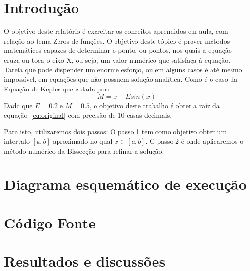 \documentclass[12pt]{article}
\begin{document}
\section{Introdução}

O objetivo deste relatório é exercitar os conceitos aprendidos em aula, com relação ao tema Zeros de funções. O objetivo deste tópico é prover métodos matemáticos capazes de determinar o ponto, ou pontos, nos quais a equação cruza ou toca o eixo X, ou seja, um valor numérico que satisfaça à equação. Tarefa que pode dispender um enorme esforço, ou em alguns casos é até mesmo impossível, em equações que não possuem solução analítica. Como é o caso da Equação de Kepler que é dada por:
\begin{equation} \label{eq:original}
  M = x - E sin(x)
\end{equation}
Dado que $E = 0.2$ e $M = 0.5$, o objetivo deste trabalho é obter a raíz da equação~\eqref{eq:original} com precisão de 10 casas decimais.

Para isto, utilizaremos dois passos: O passo 1 tem como objetivo obter um intervalo $[a,b]$ aproximado no qual $x \in [a,b]$. O passo 2 é onde aplicaremos o método numérico da Bissecção para refinar a solução.

\section{Diagrama esquemático de execução}

\newpage
\section{Código Fonte}



\newpage
\section{Resultados e discussões}

\end{document}
